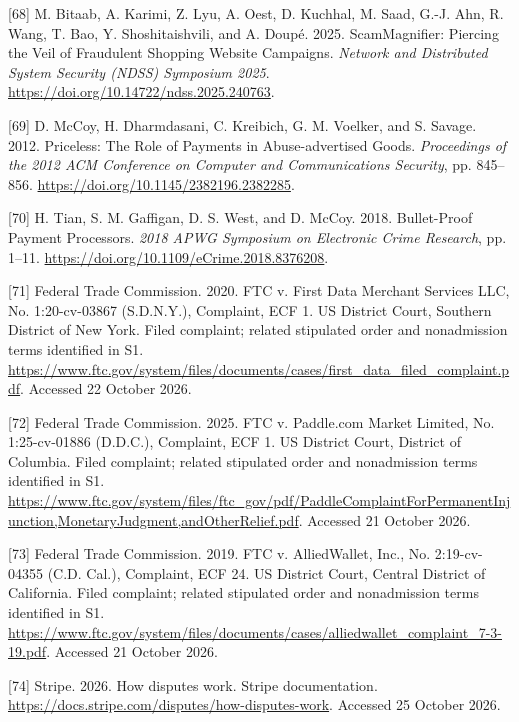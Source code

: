 \documentclass[
  11pt,
]{article}
\newlength{\cslhangindent}
\newlength{\cslentryspacingunit} %
\newenvironment{CSLReferences}[2] %
 {%
  \setlength{\parindent}{0pt}
  \ifodd #1
  \let\oldpar\par
  \def\par{\hangindent=\cslhangindent\oldpar}
  \fi
  \setlength{\parskip}{#2\cslentryspacingunit}
 }%
 {}
\begin{document}
\begin{CSLReferences}{1}{1}
\leavevmode{}%
{[}68{]} M. Bitaab, A. Karimi, Z. Lyu, A. Oest, D. Kuchhal, M. Saad,
G.-J. Ahn, R. Wang, T. Bao, Y. Shoshitaishvili, and A. Doupé. 2025.
ScamMagnifier: Piercing the Veil of Fraudulent Shopping Website
Campaigns. \emph{Network and Distributed System Security (NDSS)
Symposium 2025}. \url{https://doi.org/10.14722/ndss.2025.240763}.

\leavevmode{}%
{[}69{]} D. McCoy, H. Dharmdasani, C. Kreibich, G. M. Voelker, and S.
Savage. 2012. Priceless: The Role of Payments in Abuse-advertised Goods.
\emph{Proceedings of the 2012 ACM Conference on Computer and
Communications Security}, pp. 845--856.
\url{https://doi.org/10.1145/2382196.2382285}.

\leavevmode{}%
{[}70{]} H. Tian, S. M. Gaffigan, D. S. West, and D. McCoy. 2018.
Bullet-Proof Payment Processors. \emph{2018 APWG Symposium on Electronic
Crime Research}, pp. 1--11.
\url{https://doi.org/10.1109/eCrime.2018.8376208}.

\leavevmode{}%
{[}71{]} Federal Trade Commission. 2020. FTC v. First Data Merchant
Services LLC, No. 1:20-cv-03867 (S.D.N.Y.), Complaint, ECF 1. US
District Court, Southern District of New York. Filed complaint; related
stipulated order and nonadmission terms identified in S1.
\url{https://www.ftc.gov/system/files/documents/cases/first_data_filed_complaint.pdf}.
Accessed 22 October 2026.

\leavevmode{}%
{[}72{]} Federal Trade Commission. 2025. FTC v. Paddle.com Market
Limited, No. 1:25-cv-01886 (D.D.C.), Complaint, ECF 1. US District
Court, District of Columbia. Filed complaint; related stipulated order
and nonadmission terms identified in S1.
\url{https://www.ftc.gov/system/files/ftc_gov/pdf/PaddleComplaintForPermanentInjunction,MonetaryJudgment,andOtherRelief.pdf}.
Accessed 21 October 2026.

\leavevmode{}%
{[}73{]} Federal Trade Commission. 2019. FTC v. AlliedWallet, Inc., No.
2:19-cv-04355 (C.D. Cal.), Complaint, ECF 24. US District Court, Central
District of California. Filed complaint; related stipulated order and
nonadmission terms identified in S1.
\url{https://www.ftc.gov/system/files/documents/cases/alliedwallet_complaint_7-3-19.pdf}.
Accessed 21 October 2026.

\leavevmode{}%
{[}74{]} Stripe. 2026. How disputes work. Stripe documentation.
\url{https://docs.stripe.com/disputes/how-disputes-work}. Accessed 25
October 2026.


\end{CSLReferences}
\end{document}
